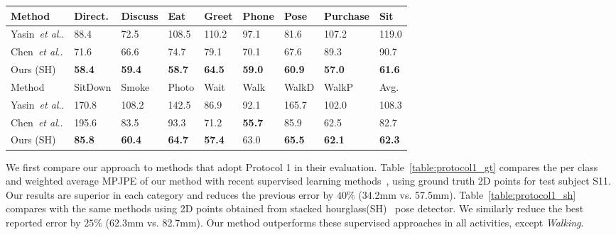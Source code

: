\documentclass[runningheads]{llncs}
\makeatletter
\DeclareRobustCommand\onedot{\futurelet\@let@token\@onedot}
\def\@onedot{\ifx\@let@token.\else.\null\fi\xspace}
\def\etal{\emph{et al}\onedot}
\makeatother
\begin{document}
\begin{table*}[t]
	\begin{tabularx}{\textwidth}{ l *{8}{Y} }
		\toprule
		Method & Direct. & Discuss & Eat & Greet & Phone & Pose & Purchase & Sit\\
		\midrule
		Yasin~\etal \cite{Yasin_2016_CVPR}& 88.4 & 72.5 & 108.5 & 110.2 & 97.1 & 81.6 & 107.2 & 119.0 \\
		Chen~\etal \cite{ChenDeva2017} &71.6 &66.6 &74.7 &79.1 &{70.1} &{67.6} &{89.3} &{90.7} \\
		Ours (SH) & \textbf{58.4}& 	\textbf{59.4}& 	\textbf{58.7}& 	\textbf{64.5}& 	\textbf{59.0} &	\textbf{60.9} &	\textbf{57.0} & \textbf{61.6}	\\

		\bottomrule
		\toprule
		Method & SitDown & Smoke & Photo & Wait & Walk & WalkD & WalkP & Avg.\\
		\midrule
		Yasin~\etal \cite{Yasin_2016_CVPR}& {170.8} & 108.2 & 142.5 & 86.9 & 92.1 & 165.7 & 102.0 & 108.3 \\
		Chen~\etal \cite{ChenDeva2017} & 195.6 & 83.5 &93.3 &71.2 &\textbf{55.7} &85.9 &62.5& 82.7 \\		
		Ours (SH) & \textbf{85.8} &	\textbf{60.4} & \textbf{64.7} & \textbf{57.4} & {63.0} & \textbf{65.5} &	\textbf{62.1} & \textbf{62.3}\\
		\bottomrule
	\end{tabularx}
\end{table*}

We first compare our approach to methods that adopt Protocol 1 in their evaluation. Table~\ref{table:protocol1_gt} compares the per class and weighted average MPJPE of our method with recent supervised learning methods~\cite{ChenDeva2017,Yasin_2016_CVPR}, using ground truth 2D points for test subject S11. Our results are superior in each category and reduces the previous error by $40\%$ (34.2mm vs. 57.5mm). Table~\ref{table:protocol1_sh} compares with the same methods using 2D points obtained from stacked hourglass(SH)~\cite{stacked-hourglass} pose detector. We similarly reduce the best reported error by $25\%$ (62.3mm vs. 82.7mm). Our method outperforms these supervised approaches in all activities, except \textit{Walking}.
\end{document}

